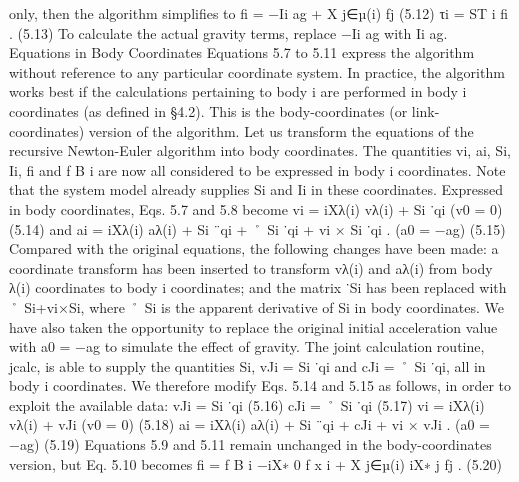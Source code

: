 only, then the algorithm simplifies to fi = −Ii ag + X j∈µ(i) fj (5.12) τi = ST i fi . (5.13) To calculate the actual gravity terms, replace −Ii ag with Ii ag. Equations in Body Coordinates Equations 5.7 to 5.11 express the algorithm without reference to any particular coordinate system. In practice, the algorithm works best if the calculations pertaining to body i are performed in body i coordinates (as defined in §4.2). This is the body-coordinates (or link-coordinates) version of the algorithm. Let us transform the equations of the recursive Newton-Euler algorithm into body coordinates. The quantities vi, ai, Si, Ii, fi and f B i are now all considered to be expressed in body i coordinates. Note that the system model already supplies Si and Ii in these coordinates. Expressed in body coordinates, Eqs. 5.7 and 5.8 become vi = iXλ(i) vλ(i) + Si ˙qi (v0 = 0) (5.14) and ai = iXλ(i) aλ(i) + Si ¨qi + ˚ Si ˙qi + vi × Si ˙qi . (a0 = −ag) (5.15) Compared with the original equations, the following changes have been made: a coordinate transform has been inserted to transform vλ(i) and aλ(i) from body λ(i) coordinates to body i coordinates; and the matrix ˙Si has been replaced with ˚ Si+vi×Si, where ˚ Si is the apparent derivative of Si in body coordinates. We have also taken the opportunity to replace the original initial acceleration value with a0 = −ag to simulate the effect of gravity. The joint calculation routine, jcalc, is able to supply the quantities Si, vJi = Si ˙qi and cJi = ˚ Si ˙qi, all in body i coordinates. We therefore modify Eqs. 5.14 and 5.15 as follows, in order to exploit the available data: vJi = Si ˙qi (5.16) cJi = ˚ Si ˙qi (5.17) vi = iXλ(i) vλ(i) + vJi (v0 = 0) (5.18) ai = iXλ(i) aλ(i) + Si ¨qi + cJi + vi × vJi . (a0 = −ag) (5.19) Equations 5.9 and 5.11 remain unchanged in the body-coordinates version, but Eq. 5.10 becomes fi = f B i −iX∗ 0 f x i + X j∈µ(i) iX∗ j fj . (5.20)

